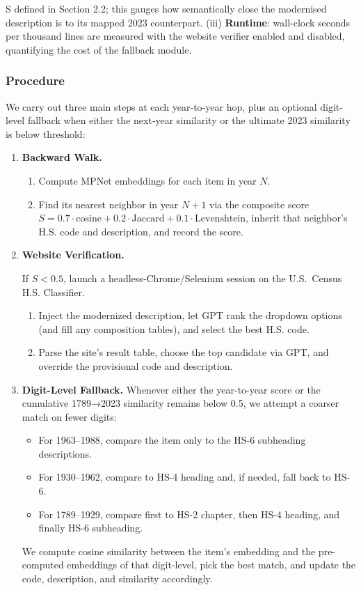 \documentclass[12pt]{article}
\begin{document}
S defined in Section 2.2; this gauges how semantically close the modernised description is to its mapped 2023 counterpart.
(iii) \textbf{Runtime}: wall-clock seconds per thousand lines are measured with the website verifier enabled and disabled, quantifying the cost of the fallback module.

\subsubsection{Procedure}
We carry out three main steps at each year‐to‐year hop, plus an optional digit-level fallback when either the next‐year similarity or the ultimate 2023 similarity is below threshold:

\begin{enumerate}
  \item \textbf{Backward Walk.}  
    \begin{enumerate}[label=(\alph*)]
      \item Compute MPNet embeddings for each item in year $N$.  
      \item Find its nearest neighbor in year $N+1$ via the composite score $S = 0.7\cdot\text{cosine} + 0.2\cdot\text{Jaccard} + 0.1\cdot\text{Levenshtein}$, inherit that neighbor’s H.S. code and description, and record the score.
    \end{enumerate}

  \item \textbf{Website Verification.}  
  
    If $S<0.5$, launch a headless‐Chrome/Selenium session on the U.S.\ Census H.S. Classifier.  
    \begin{enumerate}[label=(\alph*)]
      \item Inject the modernized description, let GPT rank the dropdown options (and fill any composition tables), and select the best H.S. code.  
      \item Parse the site’s result table, choose the top candidate via GPT, and override the provisional code and description.
    \end{enumerate}

  \item \textbf{Digit-Level Fallback.}  
    Whenever either the year-to-year score or the cumulative 1789→2023 similarity remains below 0.5, we attempt a coarser match on fewer digits:  
    \begin{itemize}
      \item For 1963–1988, compare the item only to the HS-6 subheading descriptions.  
      \item For 1930–1962, compare to HS-4 heading and, if needed, fall back to HS-6.  
      \item For 1789–1929, compare first to HS-2 chapter, then HS-4 heading, and finally HS-6 subheading.  
    \end{itemize}
    We compute cosine similarity between the item’s embedding and the pre-computed embeddings of that digit-level, pick the best match, and update the code, description, and similarity accordingly.


\end{enumerate}
\end{document}
